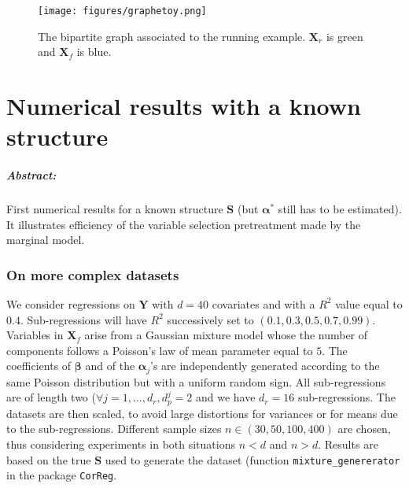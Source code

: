 \documentclass[12pt,a4paper]{report}
\begin{document}
	\begin{figure}[h!]
	\centering
	\texttt{[image: figures/graphetoy.png]} 
	\caption{The bipartite graph associated to the running example. $\boldsymbol{X}_r$ is green and $\boldsymbol{X}_f$ is blue.}
	\end{figure}			
			
\chapter{Numerical results with a known structure}	\label{chaptersimulexpl}
\paragraph{Abstract:} First numerical results for a known structure $\boldsymbol{S}$ (but $\boldsymbol{\alpha}^* $ still has to be estimated). It illustrates efficiency of the variable selection pretreatment made by the marginal model.
		 
	
	\subsection{On more complex datasets}\label{thedatasets}
		
We consider regressions on $\boldsymbol{Y}$ with $d=40$ covariates and with a $R^2$ value equal to $0.4$. Sub-regressions will have $R^2$ successively set to $(0.1,0.3,0.5,0.7,0.99)$. Variables in $\boldsymbol{X}_f$ arise from a Gaussian mixture model whose the number of components follows a Poisson's law of mean parameter equal to $5$. The coefficients of $\boldsymbol{\beta}$ and of the $\boldsymbol{\alpha}_j$'s are independently generated according to the same Poisson distribution but with a uniform random sign. All sub-regressions are of length two ($\forall j=1,\ldots,d_r, d_p^j=2$ and we have $d_r=16$ sub-regressions. The datasets are then scaled, to avoid large distortions for variances or for means due to the sub-regressions.	Different sample sizes  $n\in (30,50,100,400)$ are chosen, thus considering experiments in both situations $n<d$ and $n>d$. 
	Results are based on the true $\boldsymbol{S}$ used to generate the dataset (function {\tt mixture\_genererator} in the package {\tt CorReg}.\\
	
\end{document}
